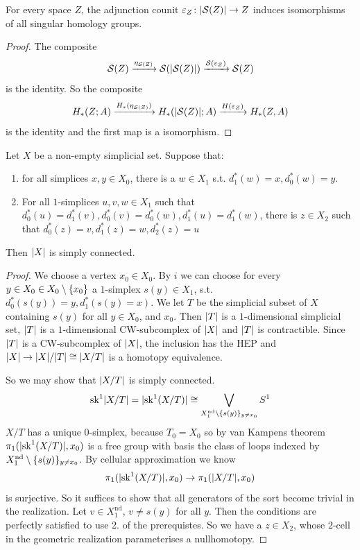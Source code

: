 \documentclass[language=english]{TemplateLecture}
\begin{document}
\begin{corollary}
    For every space \(Z\), the adjunction counit \(\varepsilon_Z\colon \lvert\mathcal{S}(Z)\rvert \to Z\) induces isomorphisms of all singular homology groups.
\end{corollary}

\begin{proof}
    The composite
    \[\mathcal{S}(Z) \xrightarrow{\eta_{\mathcal{S}(Z)}} \mathcal{S}(\lvert\mathcal{S}(Z)\rvert) \xrightarrow{\mathcal{S}(\varepsilon_Z)} \mathcal{S}(Z)\]
    is the identity. So the composite
    \[H_*(Z;A) \xrightarrow{H_*(\eta_{\mathcal{S}(Z)})} H_*(\lvert\mathcal{S}(Z)\rvert; A) \xrightarrow{H(\varepsilon_Z)} H_*(Z,A)\]
    is the identity and the first map is a isomorphism.
\end{proof}

\begin{proposition}
    Let \(X\) be a non-empty simplicial set. Suppose that:
    \begin{enumerate}
        \item for all simplices \(x, y \in X_0\), there is a \(w\in X_1\) s.t. \(d_1^*(w) = x, d_0^*(w) = y\).
        \item For all \(1\)-simplices \(u,v,w \in X_1\) such that \(d_0^*(u) = d_1^*(v), d_0^*(v) = d_0^*(w), d_1^*(u) = d_1^*(w)\), there is \(z \in X_2\) such that \(d_0^*(z) = v, d_1^*(z) = w, d_2^*(z) = u\)
    \end{enumerate}
    Then \(\lvert X\rvert\) is simply connected.
\end{proposition}

\begin{proof}
    We choose a vertex \(x_0 \in X_0\). By \(i\) we can choose for every \(y \in X_0 \in X_0\setminus\{x_0\}\) a \(1\)-simplex \(s(y)\in X_1\), s.t. \(d_0^*(s(y)) = y, d_1^*(s(y) = x)\).
    We let \(T\) be the simplicial subset of \(X\) containing \(s(y)\) for all \(y \in X_0\), and \(x_0\). Then \(\lvert T\rvert\) is a \(1\)-dimensional simplicial set, \(\lvert T\rvert\) is a \(1\)-dimensional CW-subcomplex of \(\lvert X\rvert\) and \(\lvert T\rvert\) is contractible. Since \(\lvert T\rvert\) is a CW-subcomplex of \(\lvert X\rvert\), the inclusion has the HEP and \(\lvert X\rvert \to \lvert X\rvert /\lvert T\rvert \cong \lvert X/T\rvert\) is a homotopy equivalence.

    So we may show that \(\lvert X/T\rvert\) is simply connected.
    \[\mathrm{sk}^1\lvert X/T\rvert = \lvert\mathrm{sk}^1(X/T)\rvert \cong \bigvee_{X_1^{\mathrm{nd}}\setminus\{s(y)\}_{y\neq x_0}} S^1\]
    \(X/T\) has a unique \(0\)-simplex, because \(T_0 = X_0\) so by van Kampens theorem \(\pi_1(\lvert\mathrm{sk}^1(X/T)\rvert, x_0)\) is a free group with basis the class of loops indexed by \(X_1^{\mathrm{nd}}\setminus\{s(y)\}_{y\neq x_0}\). By cellular approximation we know
    \[\pi_1(\lvert\mathrm{sk}^1(X/T)\rvert, x_0) \to \pi_1(\lvert X/T\rvert, x_0)\]
    is surjective. So it suffices to show that all generators of the sort become trivial in the realization. Let \(v \in X_1^{\mathrm{nd}}\), \(v\neq s(y)\) for all \(y\). Then the conditions are perfectly satisfied to use 2. of the prerequistes. So we have a \(z \in X_2\), whose \(2\)-cell in the geometric realization parameterises a nullhomotopy.
\end{proof}
\end{document}
